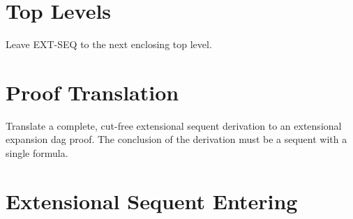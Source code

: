 \section{Top Levels}

\begin{description} 
\item[LEAVE]  
Leave EXT-SEQ to the next enclosing top level.
\item
\end{description}

\section{Proof Translation}

\begin{description} 
\item[CUTFREE-TO-EDAG]  
Translate a complete, cut-free extensional sequent derivation
to an extensional expansion dag proof.  The conclusion of the
derivation must be a sequent with a single formula.
\item
\end{description}

\section{Extensional Sequent Entering}

